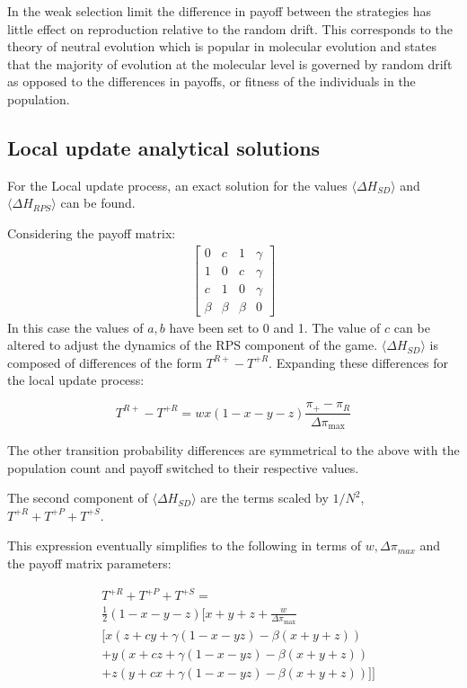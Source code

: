 \documentclass[%
 reprint,
 amsmath,amssymb,
 aps,
]{revtex4-2}
\begin{document}
In the weak selection limit the difference in payoff between the strategies has little effect on 
reproduction relative to the random drift. This corresponds to the theory of neutral evolution which is popular in 
molecular evolution and states that the majority of evolution at the molecular level is governed by random drift as opposed
to the differences in payoffs, or fitness of the individuals in the population.

\subsection{\label{section:local_analytical}Local update analytical solutions}


For the Local update process, an exact solution for the values 
$\langle \Delta H_{SD} \rangle$ and $\langle \Delta H_{RPS} \rangle$
can be found.

Considering the payoff matrix:
\begin{align} \label{SimplifiedRPS}
\begin{bmatrix}
    0 & c & 1 & \gamma\\
    1 & 0 & c & \gamma\\
    c & 1 & 0 & \gamma\\
    \beta & \beta & \beta & 0
\end{bmatrix}
\end{align}
In this case the values of $a,b$ have been set to 0 and 1. The value of $c$ can be
altered to adjust the dynamics of the RPS component of the game. $\langle \Delta H_{SD} \rangle$ is composed of differences of the form 
$T^{R+}-T^{+R}$. Expanding these differences for the local update process:


\begin{equation}
T^{R+} - T^{+R} = wx(1-x-y-z)\frac{\pi_+ - \pi_R}{\Delta \pi_{\text{max}}}
\end{equation}

The other transition probability differences are symmetrical to the above with the 
population count and payoff switched to their respective values.

The second component of $\langle \Delta H_{SD} \rangle$ are the terms scaled by $1/N^2$, $T^{+R} + T^{+P} + T^{+S}$.

This expression eventually simplifies to the following in terms of $w, \Delta \pi_{max}$ and the payoff
matrix parameters:

\begin{align}
&T^{+R} + T^{+P} + T^{+S} = \nonumber\\ 
&\frac{1}{2}(1-x-y-z)\Bigg[x + y + z + \frac{w}{\Delta \pi_{\text{max}}}  \nonumber\\
&\Big[x(z + cy + \gamma(1 - x - y z) - \beta(x+y+z))  \nonumber\\
&+ y(x + cz + \gamma(1 - x - y z) - \beta(x+y+z))  \nonumber\\
&+ z(y + cx + \gamma(1 - x - y z) - \beta(x+y+z))\Big]
\Bigg] \nonumber
\end{align}
\end{document}
